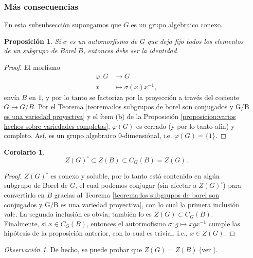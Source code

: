 \documentclass[spanish,10pt]{amsart}
\newtheorem{corollary}[theorem]{Corolario}
\newtheorem{proposition}[theorem]{Proposición}
\theoremstyle{definition}
\theoremstyle{remark}
\newtheorem{remark}[theorem]{Observación}
\numberwithin{equation}{section}
\begin{document}
\subsubsection{Más consecuencias}
En esta subsubsección supongamos que $G$ es un grupo algebraico conexo.


\begin{proposition}
Si $\sigma$ es un automorfismo de $G$ que deja fijo todos los elementos de un subgrupo de Borel $B$, entonces debe ser la identidad.
\end{proposition}
\begin{proof}
El morfismo
\begin{align*}
\varphi : G &\longrightarrow G \\
x &\longmapsto \sigma(x)x^{-1},
\end{align*}
envía $B$ en $1$, y por lo tanto se factoriza por la proyección a través del cociente $G \to G/B$. Por el Teorema \ref{teorema:los subgrupos de borel son conjugados y G/B es una variedad proyectiva} y el ítem (b) de la Proposición \ref{proposicion:varios hechos sobre variedades completas}, $\varphi (G)$ es cerrado (y por lo tanto afín) y completo. Así, es un grupo algebraico $0$-dimensiónal, i.e. $\varphi (G) = \{1\}$.
\end{proof}

\begin{corollary}
\[
    Z(G)^{\circ} \subset Z(B) \subset C_G (B) = Z(G).
\]
\end{corollary}
\begin{proof}
$Z(G)^\circ$ es conexo y soluble, por lo tanto está contenido en algún subgrupo de Borel de $G$, el cual podemos conjugar (sin afectar a $Z(G)^\circ$) para convertirlo en $B$ gracias al Teorema \ref{teorema:los subgrupos de borel son conjugados y G/B es una variedad proyectiva}, con lo cual la primera inclusión vale. La segunda inclusión es obvia; también lo es $Z(G) \subset C_G (B)$. Finalmente, si $x \in C_G (B)$, entonces el autormofismo $\sigma : g \mapsto x g x^{-1}$ cumple las hipótesis de la proposición anterior, con lo cual es trivial, i.e., $x \in Z(G)$.
\end{proof}

\begin{remark}
De hecho, se puede probar que $Z(G) = Z(B)$ (ver \cite[Corolario B \S 22.2.]{humphreys2012linearAlgebraicGroups}).
\end{remark}
\end{document}
